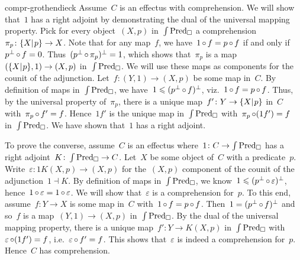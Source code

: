 \begin{solution}{compr-grothendieck}%
Assume~$C$ is an effectus with comprehension.
We will show that~$1$ has a right adjoint by demonstrating
    the dual of the universal mapping property.
Pick for every object~$(X,p)$ in~$\int \operatorname{Pred}_\square$
    a comprehension~$\pi_p \colon \{X|{\kern.2ex}p\} \to X$.
Note that for any map~$f$,
    we have~$1 \mathop{\circ} f = p \mathop{\circ} f$ if and only if~$p^\perp \mathop{\circ} f = 0$.
    Thus~$(p^\perp \mathop{\circ} \pi_p)^\perp = 1$, which shows
        that~$\pi_p$ is a map~$(\{X|{\kern.2ex}p\}, 1) \to (X,p) $ in~$\int\operatorname{Pred}_\square$.
    We will use these maps as components for the counit of the adjunction.
Let~$f\colon (Y,1) \to (X,p)$ be some map in~$C$.
By  definition of maps in~$\int \operatorname{Pred}_\square$,
    we have~$1 \leqslant (p^\perp \mathop{\circ} f)^\perp$,
    viz.~$1 \mathop{\circ} f = p \mathop{\circ} f$.
    Thus, by the universal property of~$\pi_p$,
    there is a unique map~$f'\colon Y \to \{X|{\kern.2ex}p\}$ in~$C$
    with~$\pi_p \mathop{\circ} f' = f$.
    Hence~$1 f'$ is the unique map in~$\int \operatorname{Pred}_\square$
        with~$\pi_p \mathop{\circ} (1 f') = f$ in~$\int \operatorname{Pred}_\square$.
    We have shown that~$1$ has a right adjoint.

To prove the converse, assume~$C$ is an effectus
    where~$1\colon C \to \int \operatorname{Pred}_\square$
    has a right adjoint~$K\colon \int \operatorname{Pred}_\square \to C$.
Let~$X$ be some object of~$C$ with a predicate~$p$.
    Write~$\varepsilon\colon 1 K(X,p) \to (X,p)$ for the~$(X,p)$ component of
    the counit of the adjunction~$1 \dashv K$.
    By definition of maps in~$\int \operatorname{Pred}_\square$,
        we know~$1 \leqslant (p^\perp \mathop{\circ} \varepsilon)^\perp$,
     hence~$1 \mathop{\circ} \varepsilon = 1 \mathop{\circ} \varepsilon$.
We will show that~$\varepsilon$ is a comprehension for~$p$.
To this end, assume~$f\colon Y \to X$ is some map in~$C$
    with~$1 \mathop{\circ} f = p \mathop{\circ} f$.
    Then~$1 = (p^\perp \mathop{\circ} f)^\perp$
        and so~$f$ is a map~$(Y, 1) \to (X,p)$
        in~$\int \operatorname{Pred}_\square$.
By the dual of the universal mapping property,
    there is a unique map~$f'\colon Y \to K(X,p)$ in~$\int \operatorname{Pred}_\square$
    with~$\varepsilon \mathop{\circ} (1f') = f$,
    i.e.~$\varepsilon \mathop{\circ} f' = f$.
    This shows that~$\varepsilon$ is indeed a comprehension for~$p$.
    Hence~$C$ has comprehension.
\end{solution}
